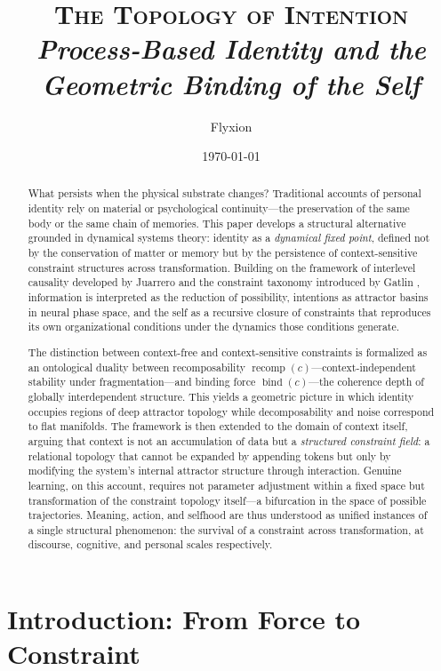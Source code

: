 \documentclass[11pt]{article}
\title{\textsc{The Topology of Intention}\\[0.4em]
{\normalsize\itshape Process-Based Identity and the Geometric Binding of the Self}}
\author{Flyxion}
\date{\today}
\newcommand{\bind}{\operatorname{bind}}
\newcommand{\recomp}{\operatorname{recomp}}
\begin{document}
\maketitle

\begin{abstract}
\noindent
What persists when the physical substrate changes? Traditional accounts of personal identity
rely on material or psychological continuity---the preservation of the same body or the same
chain of memories. This paper develops a structural alternative grounded in dynamical
systems theory: identity as a \emph{dynamical fixed point}, defined not by the conservation
of matter or memory but by the persistence of context-sensitive constraint structures across
transformation. Building on the framework of interlevel causality developed by Juarrero
\citep{juarrero1999,juarrero2002} and the constraint taxonomy introduced by Gatlin
\citep{gatlin1972}, information is interpreted as the reduction of possibility, intentions
as attractor basins in neural phase space, and the self as a recursive closure of constraints
that reproduces its own organizational conditions under the dynamics those conditions generate.

The distinction between context-free and context-sensitive constraints is formalized as
an ontological duality between recomposability $\recomp(c)$---context-independent stability
under fragmentation---and binding force $\bind(c)$---the coherence depth of globally
interdependent structure. This yields a geometric picture in which identity occupies
regions of deep attractor topology while decomposability and noise correspond to flat
manifolds. The framework is then extended to the domain of context itself, arguing that
context is not an accumulation of data but a \emph{structured constraint field}: a relational
topology that cannot be expanded by appending tokens but only by modifying the system's
internal attractor structure through interaction. Genuine learning, on this account, requires
not parameter adjustment within a fixed space but transformation of the constraint topology
itself---a bifurcation in the space of possible trajectories. Meaning, action, and selfhood
are thus understood as unified instances of a single structural phenomenon: the survival of
a constraint across transformation, at discourse, cognitive, and personal scales respectively.
\end{abstract}

\newpage

\section{Introduction: From Force to Constraint}
\end{document}
